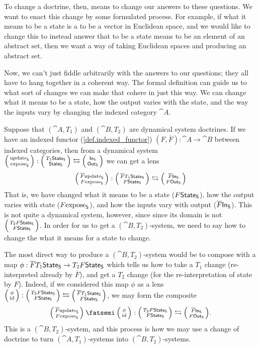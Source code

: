\documentclass[DynamicalBook]{subfiles}
\begin{document}
To change a doctrine, then, means to change our answers to these questions. We
want to enact this change by some formulated process. For example, if what it
means to be a state is a to be a vector in Euclidean space, and we would like to
change this to instead answer that to be a state means to be an element of an
abstract set, then we want a way of taking Euclidean spaces and producing an
abstract set.

Now, we can't just fiddle arbitrarily with the answers to our questions; they
all have to hang together in a coherent way. The formal definition can guide us
to what sort of changes we can make that cohere in just this way. We can change
what it means to be a state, how the output varies with the state, and the way
the inputs vary by changing the indexed category $\cat{A}$. 

Suppose that $(\cat{A}, T_1)$ and $(\cat{B}, T_2)$ are dynamical system
doctrines. If we have an indexed functor (\cref{def.indexed_functor}) $(F, \overline{F}) :
\cat{A} \to \cat{B}$ between indexed categories, then from a dynamical system
$\lens{\update{S}}{\expose{S}} : \lens{T_1\State{S}}{\State{S}} \fromto
\lens{\In{S}}{\Out{S}}$ we can get a lens 
\[
\lens{\overline{F}\update{S}}{F\expose{S}} : \lens{\overline{F}T_1
  \State{S}}{F\State{S}} \fromto \lens{\overline{F}\In{S}}{F\Out{S}}
\]
That is, we have changed what it means to be a state ($F\mathsf{State}_{\mathsf{S}}$), how the
output varies with state ($F\mathrm{expose}_{\mathsf{S}}$), and how the inputs vary with output
($\overline{F}\mathsf{In}_{\mathsf{S}}$).
This is not quite a dynamical system, however, since since its domain is not
$\lens{T_2 F\State{S}}{F\State{S}}$. In order for us to get a $(\cat{B},
T_2)$-system, we need to say how to change the what it means for a state to
change. 

The most direct way to produce a $(\cat{B}, T_2)$-system would be to compose
with a map $\phi : \overline{F}T_1 \mathsf{State}_{\mathsf{S}} \to T_2 F\mathsf{State}_{\mathsf{S}}$ which
tells us how to take a $T_1$ change (re-interpreted already by $\overline{F}$),
and get a $T_2$ change (for the re-interpretation of state by $F$). Indeed, if
we considered this map $\phi$ as a lens $\lens{\phi}{\id} : \lens{T_2 F \State{S}}{F \State{S}} \fromto \lens{\overline{F}T_1 \State{S}}{F
  \State{S}}$, we may form the composite
\[
\lens{\overline{F}\update{S}}{F\expose{S}} \then \lens{\phi}{\id} : \lens{T_2 F
  \State{S}}{F \State{S}} \fromto \lens{\overline{F}\In{S}}{F\Out{S}}.
\]
This is a $(\cat{B}, T_2)$-system, and this process is how we may use a change
of doctrine to turn $(\cat{A}, T_1)$-systems into $(\cat{B},T_2)$-systems.
\end{document}
